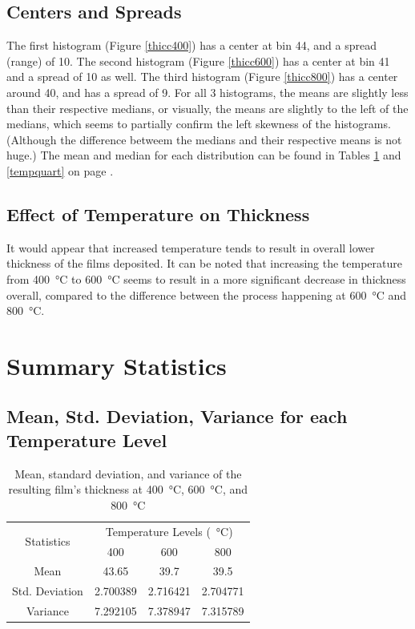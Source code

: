 \documentclass[letterpaper]{article}
\begin{document}
\subsection{Centers and Spreads}

The first histogram (Figure \ref{thicc400}) has a center at bin 44, and a spread
(range) of 10. The second histogram (Figure \ref{thicc600}) has a center at bin
41 and a spread of 10 as well. The third histogram (Figure \ref{thicc800}) has a
center around 40, and has a spread of 9. For all 3 histograms, the means are
slightly less than their respective medians, or visually, the means are slightly
to the left of the medians, which seems to partially confirm the left skewness
of the histograms. (Although the difference betweem the medians and their
respective means is not huge.) The mean and median for each distribution can be
found in Tables \ref{tempmean} and \ref{tempquart} on page \pageref{tempmean}.


\subsection{Effect of Temperature on Thickness}
It would appear that increased temperature tends to result in overall lower
thickness of the films deposited. It can be noted that increasing the
temperature from \SI{400}{\celsius} to \SI{600}{\celsius} seems to result in a
more significant decrease in thickness overall, compared to the difference
between the process happening at \SI{600}{\celsius} and \SI{800}{\celsius}.

\section{Summary Statistics}
\label{sec2}
\subsection{Mean, Std. Deviation, Variance for each Temperature Level}

\begin{table}[H]
 \centering
 \begin{tabular}{c|c|c|c|}
  \multirow{2}{*}{Statistics} & \multicolumn{3}{c|}{Temperature Levels (\SI{}{\celsius})}                       \\ \cline{2-4}
                              & 400                                                       & 600      & 800      \\ \hline
  Mean                        & 43.65                                                     & 39.7     & 39.5     \\ \hline
  Std. Deviation              & 2.700389                                                  & 2.716421 & 2.704771 \\ \hline
  Variance                    & 7.292105                                                  & 7.378947 & 7.315789 \\ \hline
 \end{tabular}
 \caption{Mean, standard deviation, and variance of the resulting film's thickness at \SI{400}{\celsius}, \SI{600}{\celsius}, and \SI{800}{\celsius}}
 \label{tempmean}
\end{table}
\end{document}
